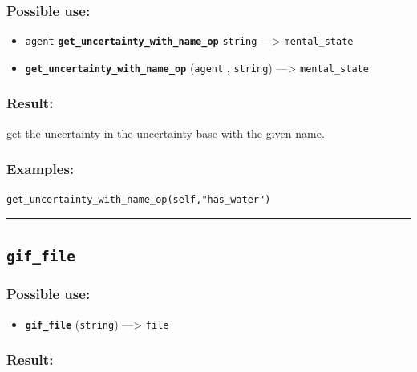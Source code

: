 \documentclass[]{book}
\providecommand{\tightlist}{%
  \setlength{\itemsep}{0pt}\setlength{\parskip}{0pt}}
\theoremstyle{definition}
\theoremstyle{definition}
\theoremstyle{definition}
\theoremstyle{remark}
\begin{document}
\subsubsection{Possible use:}\label{possible-use-235}

\begin{itemize}
\tightlist
\item
  \texttt{agent} \textbf{\texttt{get\_uncertainty\_with\_name\_op}}
  \texttt{string} ---\textgreater{} \texttt{mental\_state}
\item
  \textbf{\texttt{get\_uncertainty\_with\_name\_op}} (\texttt{agent} ,
  \texttt{string}) ---\textgreater{} \texttt{mental\_state}
\end{itemize}

\subsubsection{Result:}\label{result-227}

get the uncertainty in the uncertainty base with the given name.

\subsubsection{Examples:}\label{examples-180}

\begin{verbatim}
get_uncertainty_with_name_op(self,"has_water") 
\end{verbatim}

\begin{center}\rule{0.5\linewidth}{\linethickness}\end{center}

\subsection{\texorpdfstring{\texttt{gif\_file}}{gif\_file}}\label{gif_file}

\subsubsection{Possible use:}\label{possible-use-236}

\begin{itemize}
\tightlist
\item
  \textbf{\texttt{gif\_file}} (\texttt{string}) ---\textgreater{}
  \texttt{file}
\end{itemize}

\subsubsection{Result:}\label{result-228}
\end{document}
